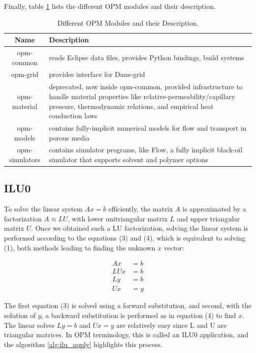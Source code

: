Finally, table \ref{tab:OPM_modules} lists the different OPM modules and their description.
\begin{table}[!t]
\centering
\begin{tabular}{c|p{12.5cm}}
Name & Description \\ \hline
opm-common     & reads Eclipse data files, provides Python bindings, build systems \\
opm-grid       & provides interface for Dune-grid \\
opm-material   & deprecated, now inside opm-common, provided infrastructure to handle material properties like relative-permeability/capillary pressure, thermodynamic relations, and empirical heat conduction laws \\
opm-models     & contains fully-implicit numerical models for flow and transport in porous media \\
opm-simulators & contains simulator programs, like Flow, a fully implicit black-oil simulator that supports solvent and polymer options \\
\end{tabular}
\caption{Different OPM Modules and their Description.}
\label{tab:OPM_modules}
\end{table}

\subsection{ILU0}
To solve the linear system $Ax=b$ efficiently, the matrix $A$ is approximated by a factorization $A\approx LU$, with lower unitriangular matrix $L$ and upper triangular matrix $U$. Once we obtained such a LU factorization, solving the linear system is performed according to the equations (3) and (4), which is equivalent to solving (1), both methods leading to finding the unknown $x$ vector:

\begin{align}
    Ax &= b \\
    LUx &= b \\
    Ly &= b \\
    Ux &= y
\end{align}

The first equation (3) is solved using a forward substitution, and second, with the solution of $y$, a backward substitution is performed as in equation (4) to find $x$. The linear solves $Ly=b$ and $Ux=y$ are relatively easy since L and U are triangular matrices. In OPM terminology, this is called an ILU0 application, and the algorithm \ref{alg:ilu_apply} highlights this process.

